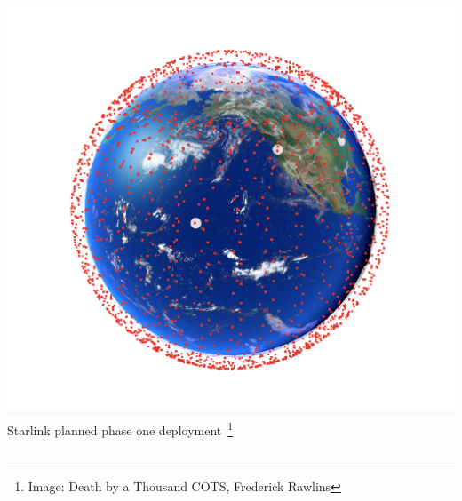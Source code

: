 \documentclass{beamer}
\begin{document}
\begin{frame}
\begin{columns}[t]
    \begin{column}{5cm}
      \centering
      \includegraphics[width=\columnwidth]{images/starlinkphase1.png}
      \newline
      Starlink planned phase one deployment~\footnote[frame]{Image: Death by a Thousand COTS, Frederick Rawlins}
    \end{column}
  \end{columns}
\end{frame}
\end{document}
